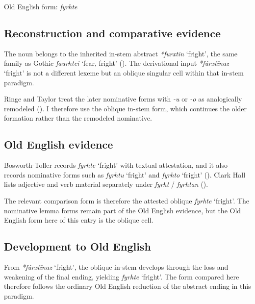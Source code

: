 \documentclass[
  british,
  a4paper,
  openany]{book}
\providecommand{\Recon}[1]{\emph{*#1}}
{\catcode`→=\active \global\def→{\ensuremath{\rightarrow}}}
\providecommand{\Recon}[1]{\emph{*#1}}
{\catcode`→=\active \global\def→{\ensuremath{\rightarrow}}}
\begin{document}
Old English form: \emph{fyrhte}

\subsection{Reconstruction and comparative
evidence}\label{reconstruction-and-comparative-evidence-113}

The noun belongs to the inherited in-stem abstract {\Recon{furxtīn}
`fright'}, the same family as Gothic {\emph{faurhtei}} `fear, fright'
(). The derivational input
{\Recon{fúrxtīnaz} `fright'} is not a different lexeme but an oblique
singular cell within that in-stem paradigm.

Ringe and Taylor treat the later nominative forms with \emph{-u} or
\emph{-o} as analogically remodeled
(). I
therefore use the oblique in-stem form, which continues the older
formation rather than the remodeled nominative.

\subsection{Old English evidence}\label{old-english-evidence-113}

Bosworth-Toller records {\emph{fyrhte}} `fright' with textual
attestation, and it also records nominative forms such as
{\emph{fyrhtu}} `fright' and {\emph{fyrhto}} `fright'
().
Clark Hall lists adjective and verb material separately under
\emph{fyrht} / \emph{fyrhtan} ().

The relevant comparison form is therefore the attested oblique
{\emph{fyrhte}} `fright'. The nominative lemma forms remain part of the
Old English evidence, but the Old English form here of this entry is the
oblique cell.

\subsection{Development to Old
English}\label{development-to-old-english-113}

From {\Recon{fúrxtīnaz} `fright'}, the oblique in-stem develops through
the loss and weakening of the final ending, yielding {\emph{fyrhte}}
`fright'. The form compared here therefore follows the ordinary Old
English reduction of the abstract ending in this paradigm.
\end{document}
